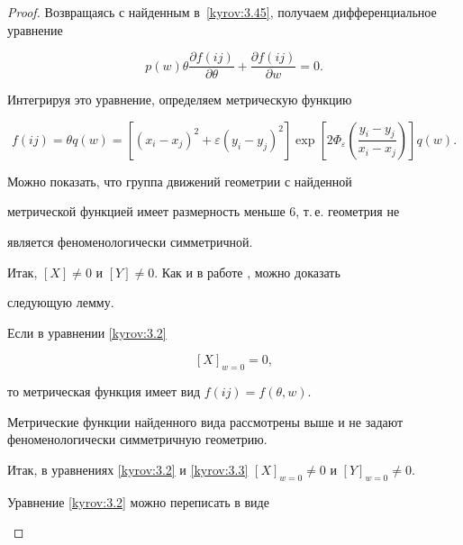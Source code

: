 \begin{proof}
Возвращаясь с найденным в~\eqref{kyrov:3.45}, получаем дифференциальное уравнение

$$

p(w)\theta\frac{\partial f(ij)}{\partial

\theta} + \frac{\partial f(ij)}{\partial w} = 0.

$$

Интегрируя это уравнение, определяем метрическую функцию

$$

 f(ij) = \theta q(w) =

[(x_i - x_j)^2 + \varepsilon(y_i -

y_j)^2]\exp\left[2\varPhi_{\varepsilon}\left(\frac{y_i-y_j}{x_i-x_j}\right)\right]q(w).

$$







Можно показать, что группа движений геометрии с найденной

метрической функцией имеет размерность меньше 6, т.\,е. геометрия не

является феноменологически симметричной.



Итак, $[X]\ne0$ и $[Y]\ne0$. Как и в работе \cite{kyrov:bib6}, можно доказать 

следующую лемму.



\begin{lemma}[1]Если в уравнении  \eqref{kyrov:3.2}

$$

[X]_{w=0}=0,

$$

то метрическая функция имеет вид $f(ij) = f(\theta,w).$

\end{lemma}



Метрические функции найденного вида рассмотрены выше и не задают феноменологически симметричную геометрию.



Итак, в уравнениях \eqref{kyrov:3.2} и \eqref{kyrov:3.3} $[X]_{w=0}\ne0$ и $[Y]_{w=0}\ne0.$



Уравнение \eqref{kyrov:3.2} можно переписать в виде

\begin{equation}

\label{kyrov:3.51}


\end{equation}
\end{proof}
